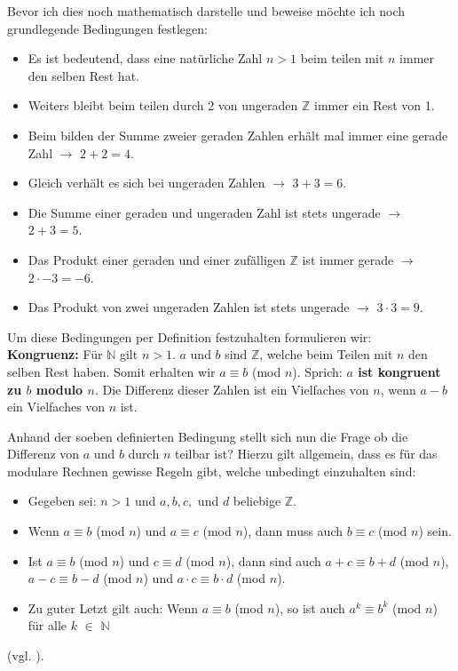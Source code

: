 \documentclass[german,12pt,a4paper]{article}
\begin{document}
Bevor ich dies noch mathematisch darstelle und beweise möchte ich noch grundlegende Bedingungen festlegen:
\begin{itemize}
    \item Es ist bedeutend, dass eine natürliche Zahl $n>1$ beim teilen mit $n$ immer den selben Rest hat.
    \item Weiters bleibt beim teilen durch 2 von ungeraden $\mathbb{Z}$ immer ein Rest von 1.
    \item Beim bilden der Summe zweier geraden Zahlen erhält mal immer eine gerade Zahl $\rightarrow$ $2+2=4$.
    \item Gleich verhält es sich bei ungeraden Zahlen $\rightarrow$ $3+3=6$.
    \item Die Summe einer geraden und ungeraden Zahl ist stets ungerade $\rightarrow$ $2+3=5$.
    \item Das Produkt einer geraden und einer zufälligen $\mathbb{Z}$ ist immer gerade $\rightarrow$ $2 \cdot -3 = -6$.
    \item Das Produkt von zwei ungeraden Zahlen ist stets ungerade $\rightarrow$ $3 \cdot 3 = 9$.
\end{itemize}

Um diese Bedingungen per Definition festzuhalten formulieren wir:\\
\textbf{Kongruenz:} Für $\mathbb{N}$ gilt $n>1$. $a$ und $b$ sind $\mathbb{Z}$, welche beim Teilen mit $n$ den selben Rest haben. Somit erhalten wir $a\equiv b$ (mod $n$). Sprich: \textbf{$a$ ist kongruent zu $b$ modulo $n$}. Die Differenz dieser Zahlen ist ein Vielfaches von $n$, wenn $a-b$ ein Vielfaches von $n$ ist.

Anhand der soeben definierten Bedingung stellt sich nun die Frage ob die Differenz von $a$ und $b$ durch $n$ teilbar ist? Hierzu gilt allgemein, dass es für das modulare Rechnen gewisse Regeln gibt, welche unbedingt einzuhalten sind:
\begin{itemize}
    \item Gegeben sei: $n>1$ und $a, b, c,$ und $d$ beliebige $\mathbb{Z}$.
    \item Wenn $a\equiv b$ (mod $n$) und $a\equiv c$ (mod $n$), dann muss auch $b\equiv c$ (mod $n$) sein.
    \item Ist $a\equiv b$ (mod $n$) und $c\equiv d$ (mod $n$), dann sind auch $a + c\equiv b + d$ (mod $n$), $a - c\equiv b - d$ (mod $n$) und $a \cdot c\equiv b \cdot d$ (mod $n$).
    \item Zu guter Letzt gilt auch: Wenn $a\equiv b$ (mod $n$), so ist auch $a^k\equiv b^k$ (mod $n$) für alle $k$ $\in$ $\mathbb{N}$
\end{itemize} (vgl. \cite[66]{RempeGillen2009}).
\end{document}
